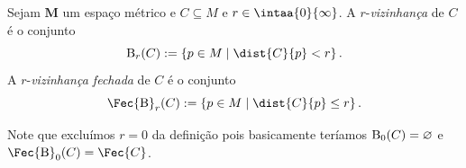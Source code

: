 \begin{defi}
Sejam $\bm M$ um espaço métrico e $C \subseteq M$ e $r \in \intaa{0}{\infty}$. A $r$-\emph{vizinhança} de $C$ é o conjunto
	\begin{equation*}
	\bola_r(C) := \set{p \in M}{\dist{C}{p} < r}.
	\end{equation*}
 A $r$-\emph{vizinhança fechada} de $C$ é o conjunto
	\begin{equation*}
	\Fec{\bola}_r(C) := \set{p \in M}{\dist{C}{p} \leq r}.
	\end{equation*}
\end{defi}

Note que excluímos $r=0$ da definição pois basicamente teríamos $\mathrm{B}_0(C) = \varnothing$ e $\Fec{\bola}_0(C) = \Fec{C}$.
	
